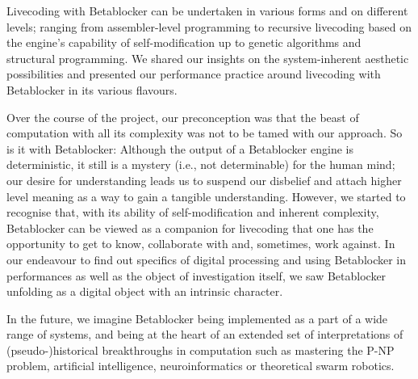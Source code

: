 \documentclass[letterpaper, 12pt]{article}
\begin{document}
Livecoding with Betablocker can be undertaken in various forms and on different levels; ranging from assembler-level programming to recursive livecoding based on the engine's capability of self-modification up to genetic algorithms and structural programming.
We shared our insights on the system-inherent aesthetic possibilities and presented our performance practice around livecoding with Betablocker in its various flavours.

Over the course of the project, our preconception was that the beast of computation with all its complexity was not to be tamed with our approach. 
So is it with Betablocker: Although the output of a Betablocker engine is deterministic, it still is a mystery (i.e., not determinable) for the human mind; our desire for understanding leads us to suspend our disbelief and attach higher level meaning as a way to gain a tangible understanding.
However, we started to recognise that, with its ability of self-modification and inherent complexity, Betablocker can be viewed as a companion for livecoding that one has the opportunity to get to know, collaborate with and, sometimes, work against.
In our endeavour to find out specifics of digital processing and using Betablocker in performances as well as the object of investigation itself, we saw Betablocker unfolding as a digital object with an intrinsic character.

In the future, we imagine Betablocker being implemented as a part of a wide range of systems, and being at the heart of an extended set of interpretations of (pseudo-)historical breakthroughs in computation such as mastering the P-NP problem, artificial intelligence, neuroinformatics or theoretical swarm robotics.
\parskip 18pt




% 

\end{document}
